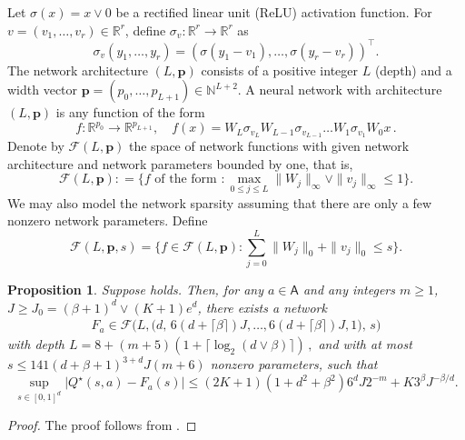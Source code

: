\documentclass{article}
\newtheorem{proposition}{Proposition}[section]
\theoremstyle{definition}
\theoremstyle{remark}
\theoremstyle{plain}
\def\eqsp{\,}
\def\rset{\mathbb{R}}
\numberwithin{equation}{section}
\begin{document}
Let $\sigma(x) = x \vee 0$ be a rectified linear unit (ReLU) activation function. For $v = (v_1, \ldots, v_r) \in \rset^r$, define $\sigma_v: \rset^r \to \rset^r$ as 
\[\sigma_v(y_1, \ldots, y_r) = (\sigma(y_1 - v_1), \ldots, \sigma(y_r - v_r))^\top.\]
The network architecture $( L, \mathbf  p)$ consists of a positive integer $ L$ (depth) and a width vector $\mathbf p = (p_0, \ldots, p_{L+1}) \in \mathbb{N}^{L+2}$. A neural network with architecture $(L, \mathbf p)$ is any function of the form
\[
f: \rset^{p_0} \to \rset^{p_{L+1}}, \quad f(x) = W_L \sigma_{v_L}W_{L-1} \sigma_{v_{L-1}} \ldots W_1 \sigma_{v_1} W_0 x \, .
\]
Denote by $\mathcal F( L, \mathbf p)$ the space of network functions with given network architecture and network parameters bounded by one, that is,
\[
\mathcal F( L,\mathbf  p): = \{f \text{ of the form }: \max_{0\le j\le L} \|W_j\|_\infty \vee \|v_j\|_\infty \le 1\}. 
\]
We may also model the network sparsity assuming that there are only a few nonzero network parameters. Define
\[
\mathcal F(L, \mathbf p, s) = \{f \in \mathcal F(L, \mathbf p): \sum_{j=0}^L \|W_j\|_0 + \|v_j\|_0 \le s \}. 
\]
\begin{proposition}
\label{coordinate approximation}
Suppose  holds. Then, for any $a \in \mathsf{A}$ and any integers $m \geq 1$, $J \geq J_0 =  (\beta+1)^d  \vee (K+1) e^d$, there exists a network
\begin{align}
F_a \in \mathcal F\big( L, \big(d, \,6(d + \lceil\beta\rceil)J, \ldots, 6(d + \lceil\beta\rceil)J, 1\big), \,s\big)
\end{align}
with depth \(L = 8 + (m+5)(1 + \lceil\log_2(d\vee\beta)\rceil)\eqsp,\) and with at most
\(
s \le 141 (d + \beta +1)^{3 + d} J (m+6)
\) nonzero parameters,
such that 
\[
\sup_{s\in[0,1]^d}\big|Q^\star(s,a)-F_a(s)\big| \le (2 K +1) (1 + d^2 + \beta^2) 6^d J 2^{-m} + K 3^\beta J^{-\beta/d}.
\]  
\end{proposition}
\begin{proof}
The proof follows from \cite[Theorem 5]{MR4134774}. 
\end{proof}
\end{document}

